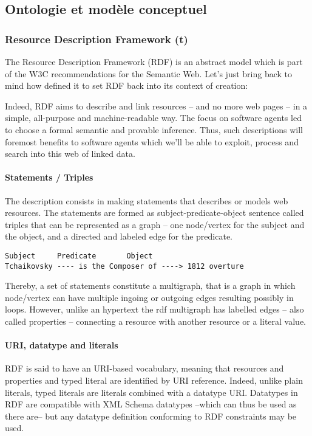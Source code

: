 \subsection{Ontologie et modèle conceptuel}
\subsubsection{Resource Description Framework (t)}
The Resource  Description Framework (RDF) is an abstract model which is part of the W3C recommendations for the Semantic Web. 
Let's just bring back to mind how  defined it to set RDF back into its context of creation: 


Indeed, RDF aims to describe and link resources – and no more web pages – in a simple, all-purpose and machine-readable way. 
The focus on software agents led to choose a formal semantic and provable inference. 
Thus, such descriptions will foremost benefits to software agents which we'll be able to exploit, process and search into this web of linked data. 

\paragraph{Statements / Triples}
The description consists in making statements that describes or models web resources. The statements are formed as subject-predicate-object sentence called triples that can be represented as a graph – one node/vertex for the subject and the object, and a directed and labeled edge for the predicate. 
\begin{Verbatim}[fontsize=\small,formatcom=\color{black!70}]
Subject		Predicate	    Object	
Tchaikovsky ---- is the Composer of ----> 1812 overture
\end{Verbatim}
Thereby, a set of statements constitute a multigraph, that is a graph in which node/vertex can have multiple ingoing or outgoing edges resulting possibly in loops. 
However, unlike an hypertext the rdf multigraph has labelled edges – also called properties -- connecting a resource with another resource or a literal value.

\paragraph{URI, datatype and literals}
RDF is said to have an URI-based vocabulary, meaning that resources and properties and typed literal are identified by URI reference. 
Indeed, unlike plain literals, typed literals are literals combined with a datatype URI.
Datatypes in RDF are compatible with XML Schema datatypes --which can thus be used as there are-- but any datatype definition conforming to RDF constraints may be used.

